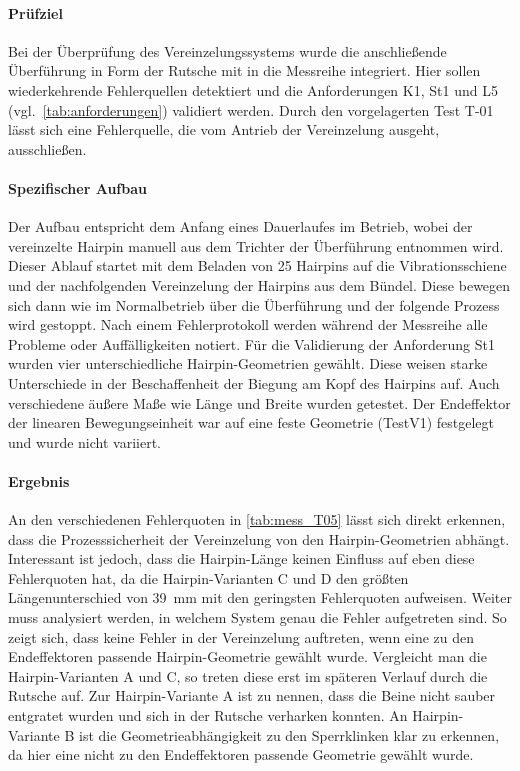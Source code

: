 \paragraph{Prüfziel}
Bei der Überprüfung des Vereinzelungssystems wurde die anschließende Überführung in Form der Rutsche mit in die Messreihe integriert. Hier sollen
wiederkehrende Fehlerquellen detektiert und die Anforderungen K1, St1 und L5 (vgl.\ \cref{tab:anforderungen}) validiert werden.
Durch den vorgelagerten Test T-01 lässt sich eine Fehlerquelle, die vom Antrieb der Vereinzelung ausgeht, ausschließen.

\paragraph{Spezifischer Aufbau}
Der Aufbau entspricht dem Anfang eines Dauerlaufes im Betrieb, wobei der vereinzelte Hairpin manuell aus dem Trichter der Überführung
entnommen wird. Dieser Ablauf startet mit dem Beladen von 25 Hairpins auf die Vibrationsschiene und der nachfolgenden Vereinzelung
der Hairpins aus dem Bündel. Diese bewegen sich dann wie im Normalbetrieb über die Überführung und der folgende Prozess wird gestoppt.
Nach einem Fehlerprotokoll werden während der Messreihe alle Probleme oder Auffälligkeiten notiert. Für die Validierung 
der Anforderung St1 wurden vier unterschiedliche Hairpin-Geometrien gewählt. Diese weisen starke Unterschiede in der Beschaffenheit
der Biegung am Kopf des Hairpins auf. Auch verschiedene äußere Maße wie Länge und Breite wurden getestet.
 Der Endeffektor der linearen Bewegungseinheit war auf eine feste Geometrie (TestV1)
festgelegt und wurde nicht variiert.

\paragraph{Ergebnis}
An den verschiedenen Fehlerquoten in \cref{tab:mess_T05} lässt sich direkt erkennen, dass die Prozesssicherheit der Vereinzelung von den Hairpin-Geometrien
abhängt. Interessant ist jedoch, dass die Hairpin-Länge keinen Einfluss auf eben diese Fehlerquoten hat, da die Hairpin-Varianten
C und D den größten Längenunterschied von \qty{39}{\milli\meter} mit den geringsten Fehlerquoten aufweisen. Weiter muss analysiert werden,
in welchem System genau die Fehler aufgetreten sind. So zeigt sich, dass keine Fehler in der Vereinzelung auftreten, wenn eine zu den
Endeffektoren passende Hairpin-Geometrie gewählt wurde. Vergleicht man die Hairpin-Varianten A und C, so treten diese erst im späteren Verlauf durch die
Rutsche auf. Zur Hairpin-Variante A ist zu nennen, dass die Beine nicht sauber entgratet wurden und sich in der Rutsche verharken konnten.
An Hairpin-Variante B ist die Geometrieabhängigkeit zu den Sperrklinken klar zu erkennen, da hier eine nicht zu den Endeffektoren passende Geometrie gewählt wurde. 

